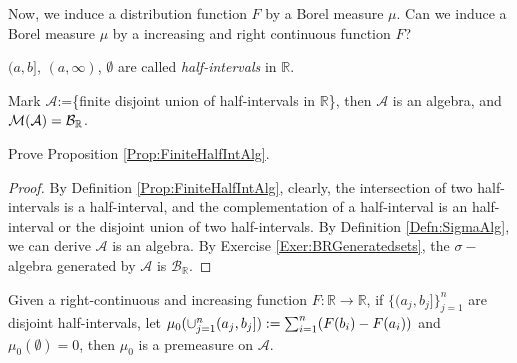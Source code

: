 \begin{rem}
    Now, we induce a distribution function $F$ by a Borel measure 
    $\mu$. Can we induce a Borel measure $\mu$ by a 
    increasing and right continuous function $F$?
\end{rem}
\begin{ntn}
    $(a,b]$, $(a,\infty)$, $\emptyset$ are called 
    \textit{half-intervals} in $\mathbb{R}$.
\end{ntn}
\begin{prop}
    \label{Prop:FiniteHalfIntAlg}
    Mark $\mathcal{A}$:=\{finite disjoint union of \newline
    half-intervals in $\mathbb{R}$\}, then 
    $\mathcal{A}$ is an algebra, 
    and $\mathcal{M}(\mathcal{A})=\mathcal{B}_{\mathbb{R}}$.
\end{prop}
\begin{exc}
    Prove Proposition \ref{Prop:FiniteHalfIntAlg}.
\end{exc}
\begin{proof}
    By Definition \ref{Prop:FiniteHalfIntAlg}, clearly, 
    the intersection of two half-intervals is a half-interval,
    and the complementation of a half-interval is an 
    half-interval or the disjoint union of two half-intervals.
    By Definition \ref{Defn:SigmaAlg}, we can derive $\mathcal{A}$
    is an algebra. By Exercise \ref{Exer:BRGeneratedsets}, 
    the $\sigma-$algebra generated by $\mathcal{A}$ is $\mathcal{B}_{\mathbb{R}}$.
\end{proof}
\begin{lem}
    \label{Lem:PremeasureOnAlg}
    Given a right-continuous and increasing function 
    $F:\mathbb{R}\rightarrow\mathbb{R}$, if 
    $\{(a_j,b_j]\}_{j=1}^{n}$ are disjoint half-intervals, 
    let $\mu_0(\cup_{j=1}^{n}(a_j,b_j]):=\sum_{i=1}^{n}(F(b_i)-F(a_i))$ 
    and $\mu_{0}(\emptyset)=0$, then $\mu_0$ is a premeasure on 
    $\mathcal{A}$.
\end{lem}
